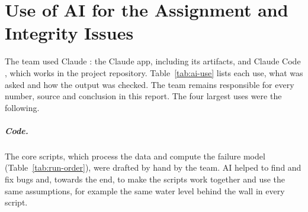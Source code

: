 \chapter*{Use of AI for the Assignment and Integrity Issues}
\label{chapter:ai-statement}




The team used Claude \parencite{anthropic_claude2026}: the Claude app, including
its artifacts, and Claude Code \parencite{anthropic_claudecode2026}, which works
in the project repository. Table~\ref{tab:ai-use} lists
each use, what was asked and how the output was checked. The team remains
responsible for every number, source and conclusion in this report. The four
largest uses were the following.

\paragraph{Code.} The core scripts, which process the data and compute the
failure model (Table~\ref{tab:run-order}), were drafted by hand by the team. AI
helped to find and fix bugs and, towards the end, to make the scripts work
together and use the same assumptions, for example the same water level behind
the wall in every script.

